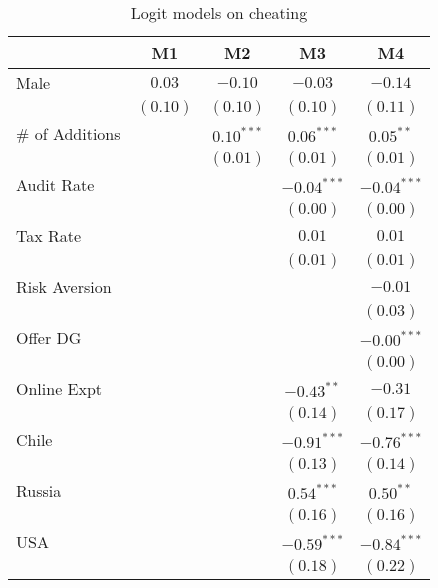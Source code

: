 
\begin{table}
\caption{Logit models on cheating}
\begin{center}
\begin{tabular}{l c c c c }
\hline
 & M1 & M2  & M3 & M4 \\
\hline
Male            & $0.03$       & $-0.10$      & $-0.03$       & $-0.14$       \\
                & $(0.10)$     & $(0.10)$     & $(0.10)$      & $(0.11)$      \\
\# of Additions &              & $0.10^{***}$ & $0.06^{***}$  & $0.05^{**}$   \\
                &              & $(0.01)$     & $(0.01)$      & $(0.01)$      \\
Audit Rate      &              &              & $-0.04^{***}$ & $-0.04^{***}$ \\
                &              &              & $(0.00)$      & $(0.00)$      \\
Tax Rate        &              &              & $0.01$        & $0.01$        \\
                &              &              & $(0.01)$      & $(0.01)$      \\
Risk Aversion   &              &              &               & $-0.01$       \\
                &              &              &               & $(0.03)$      \\
Offer DG        &              &              &               & $-0.00^{***}$ \\
                &              &              &               & $(0.00)$      \\
Online Expt     &              &              & $-0.43^{**}$  & $-0.31$       \\
                &              &              & $(0.14)$      & $(0.17)$      \\
Chile           &              &              & $-0.91^{***}$ & $-0.76^{***}$ \\
                &              &              & $(0.13)$      & $(0.14)$      \\
Russia          &              &              & $0.54^{***}$  & $0.50^{**}$   \\
                &              &              & $(0.16)$      & $(0.16)$      \\
USA             &              &              & $-0.59^{***}$ & $-0.84^{***}$ \\
                &              &              & $(0.18)$      & $(0.22)$      \\

\end{tabular}
\end{center}
\end{table}
